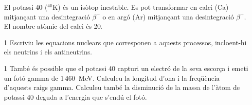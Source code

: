 El potassi 40 ($^{40}$K) és un isòtop inestable. Es pot transformar en calci (Ca) mitjançant una desintegració $\beta^-$ o en argó (Ar) mitjançant una desintegració $\beta^+$. El nombre atòmic del calci és 20.

\begin{apartat}{1}
Escriviu les equacions nuclears que corresponen a aquests processos, incloent-hi els neutrins i els antineutrins.
\end{apartat}

\begin{apartat}{1}
També és possible que el potassi 40 capturi un electró de la seva escorça i emeti un fotó gamma de 1\,460~MeV. Calculeu la longitud d'ona i la freqüència d'aquests raigs gamma. Calculeu també la disminució de la massa de l'àtom de potassi 40 deguda a l'energia que s'endú el fotó.
\end{apartat}

